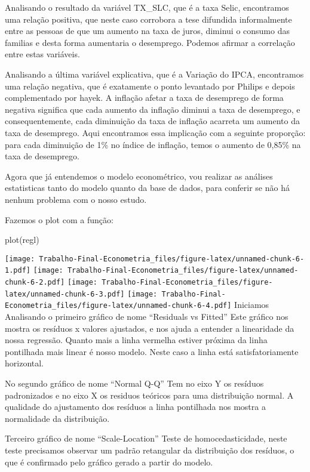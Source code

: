 \documentclass[
]{article}
\newenvironment{Shaded}{\begin{snugshade}}{\end{snugshade}}
\newcommand{\FunctionTok}[1]{\textcolor[rgb]{0.00,0.00,0.00}{#1}}
\newcommand{\NormalTok}[1]{#1}
\begin{document}
Analisando o resultado da variável TX\_SLC, que é a taxa Selic,
encontramos uma relação positiva, que neste caso corrobora a tese
difundida informalmente entre as pessoas de que um aumento na taxa de
juros, diminui o consumo das familias e desta forma aumentaria o
desemprego. Podemos afirmar a correlação entre estas variáveis.

Analisando a última variável explicativa, que é a Variação do IPCA,
encontramos uma relação negativa, que é exatamente o ponto levantado por
Philips e depois complementado por hayek. A inflação afetar a taxa de
desemprego de forma negativa significa que cada aumento da inflação
diminui a taxa de desemprego, e consequentemente, cada diminuição da
taxa de inflação acarreta um aumento da taxa de desemprego. Aqui
encontramos essa implicação com a seguinte proporção: para cada
diminuição de 1\% no índice de inflação, temos o aumento de 0,85\% na
taxa de desemprego.

Agora que já entendemos o modelo econométrico, vou realizar as análises
estatisticas tanto do modelo quanto da base de dados, para conferir se
não há nenhum problema com o nosso estudo.

Fazemos o plot com a função:

\begin{Shaded}
\begin{Highlighting}[]
\FunctionTok{plot}\NormalTok{(regl)}
\end{Highlighting}
\end{Shaded}

\texttt{[image: Trabalho-Final-Econometria\_files/figure-latex/unnamed-chunk-6-1.pdf]}
\texttt{[image: Trabalho-Final-Econometria\_files/figure-latex/unnamed-chunk-6-2.pdf]}
\texttt{[image: Trabalho-Final-Econometria\_files/figure-latex/unnamed-chunk-6-3.pdf]}
\texttt{[image: Trabalho-Final-Econometria\_files/figure-latex/unnamed-chunk-6-4.pdf]}
Iniciamos Analisando o primeiro gráfico de nome ``Residuals vs Fitted''
Este gráfico nos mostra os resíduos x valores ajustados, e nos ajuda a
entender a linearidade da nossa regressão. Quanto mais a linha vermelha
estiver próxima da linha pontilhada mais linear é nosso modelo. Neste
caso a linha está satisfatoriamente horizontal.

No segundo gráfico de nome ``Normal Q-Q'' Tem no eixo Y os resíduos
padronizados e no eixo X os residuos teóricos para uma distribuição
normal. A qualidade do ajustamento dos resíduos a linha pontilhada nos
mostra a normalidade da distribuição.

Terceiro gráfico de nome ``Scale-Location'' Teste de homocedasticidade,
neste teste precisamos observar um padrão retangular da distribuição dos
resíduos, o que é confirmado pelo gráfico gerado a partir do modelo.
\end{document}
